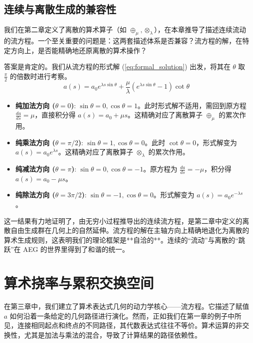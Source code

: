 \documentclass[a4paper,12pt]{book}
\numberwithin{problem}{section}
\numberwithin{definition}{section}
\numberwithin{lemma}{section}
\numberwithin{proposition}{section}
\numberwithin{theorem}{section}
\numberwithin{grammar}{section}
\numberwithin{program}{section}
\numberwithin{convention}{section}
\numberwithin{corollary}{section}
\begin{document}
\section{连续与离散生成的兼容性}
\label{sec:consistency}

我们在第二章定义了离散的算术算子（如 $\oplus_\mu, \otimes_\lambda$），在本章推导了描述连续流动的流方程。一个至关重要的问题是：这两套描述体系是否兼容？流方程的解，在特定方向上，是否能精确地还原离散的算术操作？

答案是肯定的。我们从流方程的形式解 (\ref{eq:formal_solution}) 出发，将其在 $\theta$ 取 $\frac{\pi}{2}$ 的倍数时进行考察。
\[ a(s) = a_0 e^{\lambda s \sin \theta} + \frac{\mu}{\lambda} (e^{\lambda s \sin \theta} - 1) \cot \theta \]
\begin{itemize}
    \item \textbf{纯加法方向 ($\theta=0$)}: $\sin\theta=0, \cos\theta=1$。此时形式解不适用，需回到原方程 $\frac{da}{ds} = \mu$，直接积分得 $a(s) = a_0 + \mu s$。这精确对应了离散算子 $\oplus_\mu$ 的累次作用。
    \item \textbf{纯乘法方向 ($\theta=\pi/2$)}: $\sin\theta=1, \cos\theta=0$。此时 $\cot\theta=0$，形式解变为 $a(s) = a_0 e^{\lambda s}$。这精确对应了离散算子 $\otimes_\lambda$ 的累次作用。
    \item \textbf{纯减法方向 ($\theta=\pi$)}: $\sin\theta=0, \cos\theta=-1$。原方程为 $\frac{da}{ds} = -\mu$，积分得 $a(s) = a_0 - \mu s$。
    \item \textbf{纯除法方向 ($\theta=3\pi/2$)}: $\sin\theta=-1, \cos\theta=0$。形式解变为 $a(s) = a_0 e^{-\lambda s}$。
\end{itemize}

这一结果有力地证明了，由无穷小过程推导出的连续流方程，是第二章中定义的离散自由生成群在几何上的自然延伸。流方程的解在主轴方向上精确地退化为离散的算术生成规则，这表明我们的理论框架是**自洽的**。连续的“流动”与离散的“跳跃”在 AEG 的世界里得到了和谐的统一。


\chapter{算术挠率与累积交换空间}
\label{chap:torsion_and_acs}

在第三章中，我们建立了算术表达式几何的动力学核心——流方程。它描述了赋值 $a$ 如何沿着一条给定的几何路径进行演化。然而，正如我们在第一章的例子中所见，连接相同起点和终点的不同路径，其代数表达式往往不等价。算术运算的非交换性，尤其是加法与乘法的混合，导致了计算结果的路径依赖性。
\end{document}

